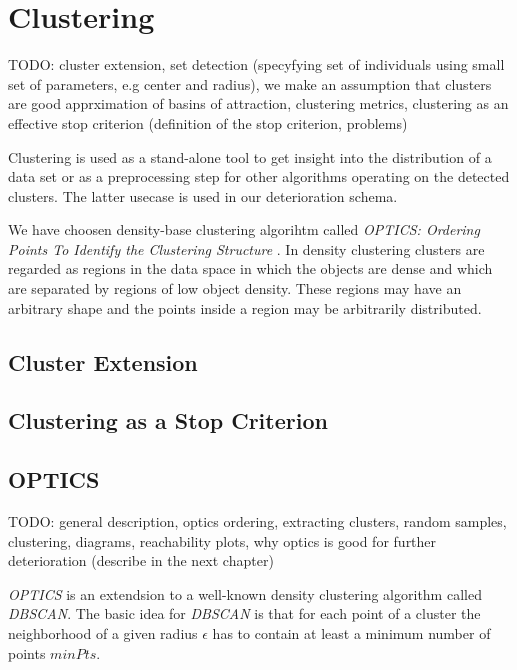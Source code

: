 
\chapter{Clustering}
\label{Clustering}

TODO: cluster extension, set detection (specyfying set of individuals using
small set of parameters, e.g center and radius),
we make an assumption that clusters are good apprximation of basins of
attraction,
clustering metrics,
clustering as an effective stop criterion (definition of the stop criterion,
problems)

Clustering is used as a stand-alone tool to get insight into the distribution
of a data set or as a preprocessing step for other algorithms operating on the
detected clusters. The latter usecase is used in our deterioration schema.

We have choosen density-base clustering algorihtm called \textit{OPTICS:
Ordering Points To Identify the Clustering Structure} \cite{optics}. In density
clustering clusters are regarded as regions in the data space in which the objects are 
dense and which are separated by regions of low object density. These regions
may have an arbitrary shape and the points inside a region may be arbitrarily
distributed.

\section{Cluster Extension}

\section{Clustering as a Stop Criterion}

\section{OPTICS}

TODO: general description, optics ordering, extracting clusters, random samples,
clustering, diagrams, reachability plots,
why optics is good for further deterioration (describe in the next chapter)

\textit{OPTICS} is an extendsion to a well-known density clustering algorithm
called \textit{DBSCAN}. The basic idea for \textit{DBSCAN} is that for each
point of a cluster the neighborhood of a given radius $\epsilon$ has to contain
at least a minimum number of points $minPts$.

